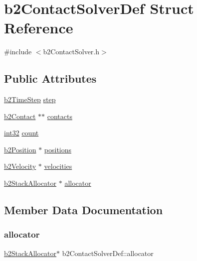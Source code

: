 \hypertarget{structb2_contact_solver_def}{}\section{b2\+Contact\+Solver\+Def Struct Reference}
\label{structb2_contact_solver_def}


{\ttfamily \#include $<$b2\+Contact\+Solver.\+h$>$}

\subsection*{Public Attributes}
\begin{DoxyCompactItemize}
\item 
\mbox{\hyperlink{structb2_time_step}{b2\+Time\+Step}} \mbox{\hyperlink{structb2_contact_solver_def_a544604c01e6606ab54b8ccd5289a7ac7}{step}}
\item 
\mbox{\hyperlink{classb2_contact}{b2\+Contact}} $\ast$$\ast$ \mbox{\hyperlink{structb2_contact_solver_def_a4b9d708e3122cab8d9dabeafefc7a9af}{contacts}}
\item 
\mbox{\hyperlink{b2_settings_8h_a43d43196463bde49cb067f5c20ab8481}{int32}} \mbox{\hyperlink{structb2_contact_solver_def_ae977ea1cee4b7b9ee99210d9b66f88ea}{count}}
\item 
\mbox{\hyperlink{structb2_position}{b2\+Position}} $\ast$ \mbox{\hyperlink{structb2_contact_solver_def_aaf1432d040aa6279d91d8c9f24a4728a}{positions}}
\item 
\mbox{\hyperlink{structb2_velocity}{b2\+Velocity}} $\ast$ \mbox{\hyperlink{structb2_contact_solver_def_ae839e5c5464aa54c1ad8ce1634b49a1f}{velocities}}
\item 
\mbox{\hyperlink{classb2_stack_allocator}{b2\+Stack\+Allocator}} $\ast$ \mbox{\hyperlink{structb2_contact_solver_def_a54198ac9886a988b9ffd06cf28c4c45c}{allocator}}
\end{DoxyCompactItemize}


\subsection{Member Data Documentation}
\mbox{\label{structb2_contact_solver_def_a54198ac9886a988b9ffd06cf28c4c45c}} 
\subsubsection{\texorpdfstring{allocator}{allocator}}
{\footnotesize\ttfamily \mbox{\hyperlink{classb2_stack_allocator}{b2\+Stack\+Allocator}}$\ast$ b2\+Contact\+Solver\+Def\+::allocator}

